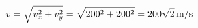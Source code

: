 \documentclass[preview]{standalone}
\begin{document}
\begin{align*}
\special{dvisvgm:raw <g id='unique000'>}v = \sqrt{v_x^2 + v_y^2} = \sqrt{200^2 + 200^2} = 200\sqrt{2}\,\mathrm{m/s}\special{dvisvgm:raw </g>}
\end{align*}
\end{document}
